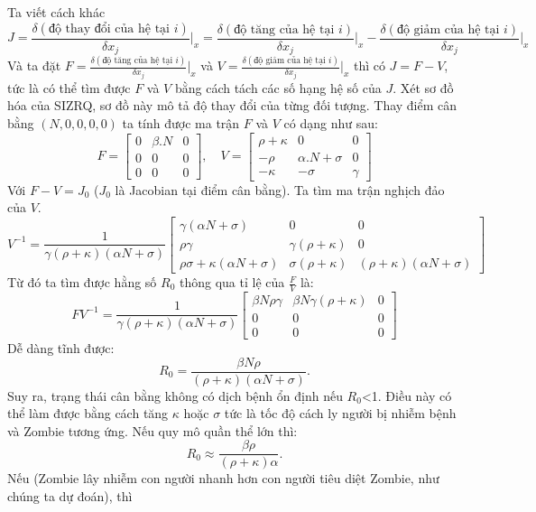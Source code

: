 \documentclass[12pt]{scrartcl}
\begin{document}
Ta viết cách khác \[
J = \frac{\delta(\text{độ thay đổi của hệ tại }i)}{\delta x_j}\Bigg|_{x} = 
\frac{\delta(\text{độ tăng của hệ tại }i)}{\delta x_j}\Bigg|_{x} - \frac{\delta(\text{độ giảm của hệ tại }i)}{\delta x_j}\Bigg|_{x}
\]
Và ta đặt $F = 
\frac{\delta(\text{độ tăng của hệ tại }i)}{\delta x_j}\Bigg|_{x}$ và $V =\frac{\delta(\text{độ giảm của hệ tại }i)}{\delta x_j}\Bigg|_{x}$ thì có $J = F - V$, tức là có thể tìm được $F$ và $V$ bằng cách tách các số hạng hệ số của $J$. Xét sơ đồ hóa của SIZRQ, sơ đồ này mô tả độ thay đổi của từng đối tượng.
Thay điểm cân bằng $(N, 0, 0, 0, 0)$ ta tính được ma trận $F$ và $V$ có dạng như sau:
\[
F =
\begin{bmatrix}
0 & \beta.N & 0 \\[6pt]
0 & 0 & 0 \\[6pt]
0 & 0 & 0
\end{bmatrix}
,
\quad
V=
\begin{bmatrix}
    \rho+\kappa & 0 & 0 \\[6pt]
    -\rho & \alpha.N + \sigma & 0 \\[6pt]
    -\kappa & -\sigma  & \gamma
\end{bmatrix}
\]
Với $F-V = J_0$ ($J_0$ là Jacobian tại điểm cân bằng). Ta tìm ma trận nghịch đảo của $V$.
\[
V^{-1} =
\frac{1}{\gamma (\rho+\kappa)(\alpha N+\sigma)}
\begin{bmatrix}
\gamma (\alpha N+\sigma) & 0 & 0 \\[6pt]
\rho \gamma & \gamma (\rho+\kappa) & 0 \\[6pt]
\rho \sigma + \kappa (\alpha N+\sigma) & \sigma (\rho+\kappa) & (\rho+\kappa)(\alpha N+\sigma)
\end{bmatrix}
\]
Từ đó ta tìm được hằng số $R_0$ thông qua tỉ lệ của $\frac{F}{V}$ là:
\[
FV^{-1} =
\frac{1}{\gamma (\rho+\kappa)(\alpha N+\sigma)}
\begin{bmatrix}
\beta N \rho \gamma & \beta N \gamma (\rho+\kappa) & 0 \\[6pt]
0 & 0 & 0 \\[6pt]
0 & 0 & 0
\end{bmatrix}
\]
Dễ dàng tĩnh được:
\[
R_0 = \frac{\beta N \rho}{(\rho+\kappa)(\alpha N + \sigma)}.
\]
Suy ra, trạng thái cân bằng không có dịch bệnh ổn định nếu $R_0$<1. Điều này có thể làm được bằng cách tăng $\kappa$ hoặc $\sigma$ tức là tốc độ cách ly người bị nhiễm bệnh và Zombie tương ứng. Nếu quy mô quần thể lớn thì:
\[
R_0 \approx \frac{\beta \rho}{(\rho+\kappa)\alpha}.
\]
 Nếu (Zombie lây nhiễm con người nhanh hơn con người tiêu diệt Zombie, như chúng ta dự đoán), thì
\end{document}
